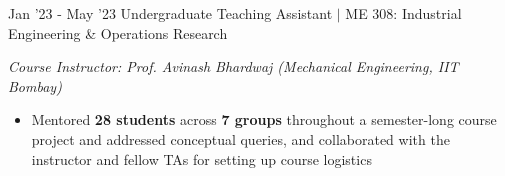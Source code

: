 \documentclass[9pt]{developercv}
\begin{document}
\begin{entrylist}
	\entry
        {Jan '23 - May '23}
		{Undergraduate Teaching Assistant $\mid$ ME 308: Industrial Engineering \& Operations Research}
		{}
		{\vspace{-9.5pt}
            
            \textit{Course Instructor: Prof. Avinash Bhardwaj (Mechanical Engineering, IIT Bombay)}
            {\vspace{2pt}
        \begin{itemize}[noitemsep, topsep=0pt, parsep=0pt, partopsep=0pt, leftmargin=9pt]
            \item Mentored \textbf{28 students} across \textbf{7 groups} throughout a semester-long course project and addressed conceptual queries, and collaborated with the instructor and fellow TAs for setting up course logistics
        \end{itemize}}}
\end{entrylist}
\end{document}
